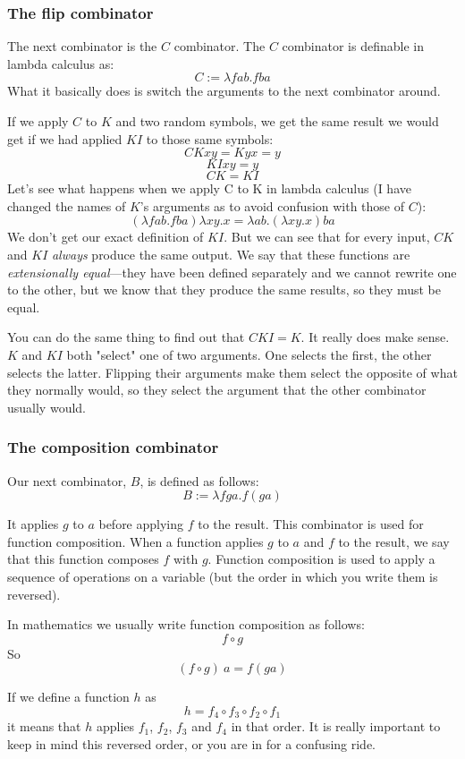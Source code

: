 \documentclass[11pt]{article}
\begin{document}
\subsubsection{The flip combinator}\label{flipcombinator}

The next combinator is the \(C\) combinator. The \(C\) combinator is definable
in lambda calculus as:
\[C:=\lambda fab.fba\]
What it basically does is switch the arguments to the next combinator around.

If we apply \(C\) to \(K\) and two random symbols, we get the same result we
would get if we had applied \(KI\) to those same symbols:
\[CKxy=Kyx=y\]
\[KIxy=y\]
\[CK=KI\]
Let's see what happens when we apply C to K in lambda calculus (I have changed
the names of \(K\)'s arguments as to avoid confusion with those of \(C\)):
\[(\lambda fab.fba)\lambda xy.x=\lambda ab.(\lambda xy.x)ba\]
We don't get our exact definition of \(KI\). But we can see that for every
input, \(CK\) and \(KI\) \emph{always} produce the same output. We say that
these functions are \emph{extensionally equal}---they have been defined
separately and we cannot rewrite one to the other, but we know that they
produce the same results, so they must be equal.

You can do the same thing to find out that \(CKI=K\). It really does make
sense. \(K\) and \(KI\) both "select" one of two arguments. One selects the
first, the other selects the latter. Flipping their arguments make them select
the opposite of what they normally would, so they select the argument that the
other combinator usually would.

\subsubsection{The composition combinator}\label{composition}

Our next combinator, \(B\), is defined as follows:
\[B:=\lambda fga.f(ga)\]

It applies \(g\) to \(a\) before applying \(f\) to the result. This combinator
is used for function composition. When a function applies \(g\) to \(a\) and
\(f\) to the result, we say that this function composes \(f\) with \(g\).
Function composition is used to apply a sequence of operations on a variable
(but the order in which you write them is reversed).

In mathematics we usually write function composition as follows:
\[f\circ g\]
So
\[(f\circ g)\ a=f(ga)\]

If we define a function \(h\) as
\[h=f_4\circ f_3\circ f_2\circ f_1\]
it means that \(h\) applies \(f_1\), \(f_2\), \(f_3\) and \(f_4\) in that
order. It is really important to keep in mind this reversed order, or you are in
for a confusing ride.
\end{document}
